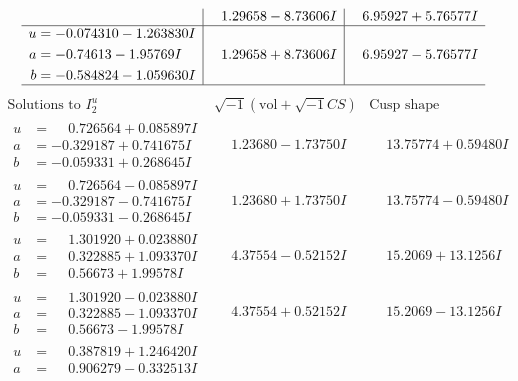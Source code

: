 \documentclass[1p]{elsarticle_modified}
\theoremstyle{definition}
\newcommand{\I}{\sqrt{-1}}
\begin{document}
$$\begin{array}{c|c|c}
 & \phantom{-}1.29658 - 8.73606 I & \phantom{-}6.95927 + 5.76577 I \\ \hline\begin{aligned}
u &= -0.074310 - 1.263830 I \\
a &= -0.74613 - 1.95769 I \\
b &= -0.584824 - 1.059630 I\end{aligned}
 & \phantom{-}1.29658 + 8.73606 I & \phantom{-}6.95927 - 5.76577 I\\
 \hline 
 \end{array}$$\newpage$$\begin{array}{c|c|c}  
\text{Solutions to }I^u_{2}& \I (\text{vol} + \sqrt{-1}CS) & \text{Cusp shape}\\
 \hline 
\begin{aligned}
u &= \phantom{-}0.726564 + 0.085897 I \\
a &= -0.329187 + 0.741675 I \\
b &= -0.059331 + 0.268645 I\end{aligned}
 & \phantom{-}1.23680 - 1.73750 I & \phantom{-}13.75774 + 0.59480 I \\ \hline\begin{aligned}
u &= \phantom{-}0.726564 - 0.085897 I \\
a &= -0.329187 - 0.741675 I \\
b &= -0.059331 - 0.268645 I\end{aligned}
 & \phantom{-}1.23680 + 1.73750 I & \phantom{-}13.75774 - 0.59480 I \\ \hline\begin{aligned}
u &= \phantom{-}1.301920 + 0.023880 I \\
a &= \phantom{-}0.322885 + 1.093370 I \\
b &= \phantom{-}0.56673 + 1.99578 I\end{aligned}
 & \phantom{-}4.37554 - 0.52152 I & \phantom{-}15.2069 + 13.1256 I \\ \hline\begin{aligned}
u &= \phantom{-}1.301920 - 0.023880 I \\
a &= \phantom{-}0.322885 - 1.093370 I \\
b &= \phantom{-}0.56673 - 1.99578 I\end{aligned}
 & \phantom{-}4.37554 + 0.52152 I & \phantom{-}15.2069 - 13.1256 I \\ \hline\begin{aligned}
u &= \phantom{-}0.387819 + 1.246420 I \\
a &= \phantom{-}0.906279 - 0.332513 I \\

\end{aligned}
\end{array}$$
\end{document}
